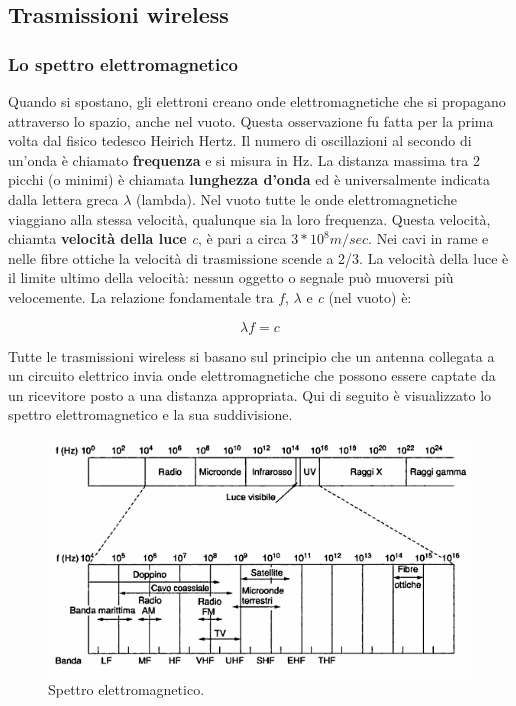 \newpage

\subsection{Trasmissioni wireless}

\subsubsection{Lo spettro elettromagnetico}

Quando si spostano, gli elettroni creano onde elettromagnetiche che si propagano attraverso lo spazio, anche nel vuoto. Questa osservazione fu fatta per la prima volta dal fisico tedesco Heirich Hertz. Il numero di oscillazioni al secondo di un'onda è chiamato \textbf{frequenza} e si misura in Hz. La distanza massima tra 2 picchi (o minimi) è chiamata \textbf{lunghezza d'onda} ed è universalmente indicata dalla lettera greca $\lambda$ (lambda).
Nel vuoto tutte le onde elettromagnetiche viaggiano alla stessa velocità, qualunque sia la loro frequenza. Questa velocità, chiamta \textbf{velocità della luce} \textit{c}, è pari a circa $3*10^8 m/sec$. Nei cavi in rame e nelle fibre ottiche la velocità di trasmissione scende a 2/3. La velocità della luce è il limite ultimo della velocità: nessun oggetto o segnale può muoversi più velocemente.
La relazione fondamentale tra $f$, $\lambda$ e \textit{c} (nel vuoto) è:

$$\lambda f = c$$

Tutte le trasmissioni wireless si basano sul principio che un antenna collegata a un circuito elettrico invia onde elettromagnetiche che possono essere captate da un ricevitore posto a una distanza appropriata. Qui di seguito è visualizzato lo spettro elettromagnetico e la sua suddivisione.

\begin{figure}[htpb]
\centering
\includegraphics[scale=1]{images/spettro.png}
\caption{Spettro elettromagnetico.}
\end{figure}

